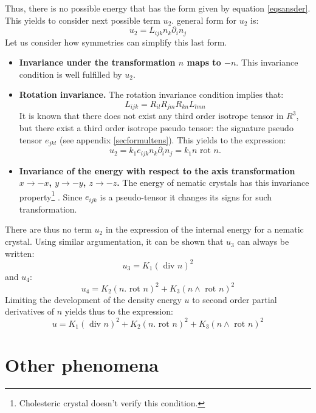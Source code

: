 \documentclass[12pt]{book}
\begin{document}
Thus, there is no possible energy that has the form given by equation
\ref{eqsansder}. This yields to consider next possible term $u_2$. general
form for $u_2$ is:
\begin{equation}
u_2=L_{ijk}n_k\partial_in_j
\end{equation}
Let us consider how symmetries can simplify this last form.
\begin{itemize}
\item {\bf Invariance under the transformation $n$ maps to $-n$}. This
  invariance condition is well fulfilled by $u_2$.
\item {\bf Rotation invariance.} The rotation invariance condition implies
  that:
\begin{equation}
L_{ijk}=R_{il}R_{jm}R_{kn}L_{lmn}
\end{equation}
It is known that there does not exist any third order isotrope tensor in
$R^3$, but there exist a third order isotrope pseudo tensor: the signature
pseudo tensor $e_{jkl}$ (see appendix \ref{secformultens}). This yields to the
expression: 
\begin{equation}
u_2=k_1e_{ijk}n_k\partial_in_j=k_1n\mbox{ rot } n.
\end{equation}
\item {\bf Invariance of the energy with respect to the axis transformation
    $x\rightarrow -x$, $y\rightarrow -y$, $z\rightarrow -z$.} The energy of
  nematic crystals has this invariance property\footnote{%
Cholesteric crystal doesn't verify this condition.}%
. Since $e_{ijk}$ is a pseudo-tensor it changes its signs for such
transformation.
\end{itemize}
There are thus no term $u_2$ in the expression of the internal energy for a
nematic crystal.
Using similar argumentation, it can be shown that $u_3$ can always be
written:
\begin{equation}
u_3=K_1 (\mbox{ div } n)^2
\end{equation}
and $u_4$:
\begin{equation}
u_4=K_2 (n.\mbox{ rot } n)^2+K_3(n \wedge \mbox{ rot } n)^2
\end{equation}
Limiting the development of the density energy $u$ to second order partial
derivatives of $n$ yields thus to the expression:
\begin{equation}
u=K_1 (\mbox{ div } n)^2+K_2 (n.\mbox{ rot } n)^2+K_3(n \wedge \mbox{ rot } n)^2
\end{equation}


\section{Other phenomena}
\end{document}
